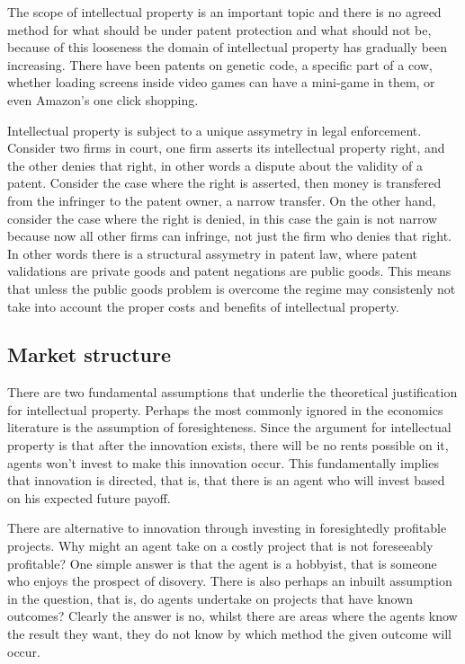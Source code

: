 \documentclass[12pt]{article}
\numberwithin{equation}{section}
\begin{document}

The scope of intellectual property is an important topic and there is no agreed method for what should be under patent protection and what should not be, because of this looseness the domain of intellectual property has gradually been increasing. There have been patents on genetic code, a specific part of a cow, whether loading screens inside video games can have a mini-game in them, or even Amazon's one click shopping. 


Intellectual property is subject to a unique assymetry in legal enforcement. Consider two firms in court, one firm asserts its intellectual property right, and the other denies that right, in other words a dispute about the validity of a patent. Consider the case where the right is asserted, then money is transfered from the infringer to the patent owner, a narrow transfer. On the other hand, consider the case where the right is denied, in this case the gain is not narrow because now all other firms can infringe, not just the firm who denies that right. In other words there is a structural assymetry in patent law, where patent validations are private goods and patent negations are public goods. This means that unless the public goods problem is overcome the regime may consistenly not take into account the proper costs and benefits of intellectual property.


\subsection{Market structure}
There are two fundamental assumptions that underlie the theoretical justification for intellectual property. Perhaps the most commonly ignored in the economics literature is the assumption of foresighteness. Since the argument for intellectual property is that after the innovation exists, there will be no rents possible on it, agents won't invest to make this innovation occur. This fundamentally implies that innovation is directed, that is, that there is an agent who will invest based on his expected future payoff. 


There are alternative to innovation through investing in foresightedly profitable projects. Why might an agent take on a costly project that is not foreseeably profitable? One simple answer is that the agent is a hobbyist, that is someone who enjoys the prospect of disovery. There is also perhaps an inbuilt assumption in the question, that is, do agents undertake on projects that have known outcomes? Clearly the answer is no, whilst there are areas where the agents know the result they want, they do not know by which method the given outcome will occur. 
\end{document}
